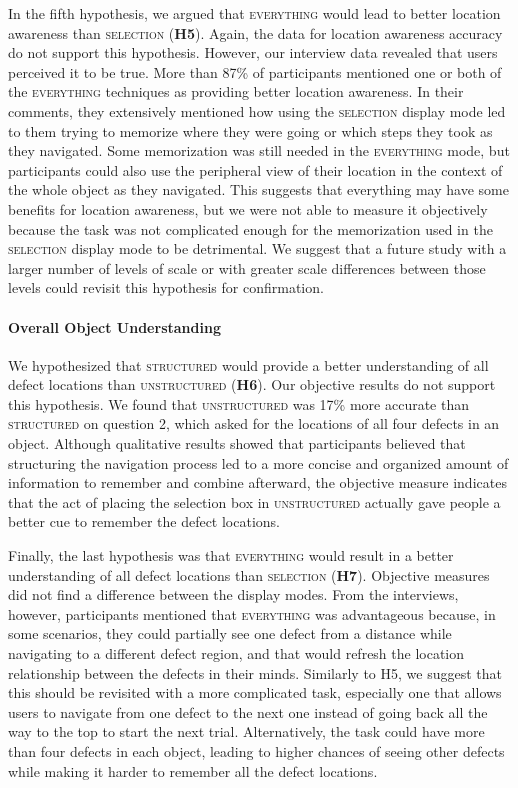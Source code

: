 In the fifth hypothesis, we argued that \textsc{everything} would lead to better location awareness than \textsc{selection} (\textbf{H5}). Again, the data for location awareness accuracy do not support this hypothesis. However, our interview data revealed that users perceived it to be true. More than 87\% of participants mentioned one or both of the \textsc{everything} techniques as providing better location awareness. In their comments, they extensively mentioned how using the \textsc{selection} display mode led to them trying to memorize where they were going or which steps they took as they navigated. Some memorization was still needed in the \textsc{everything} mode, but participants could also use the peripheral view of their location in the context of the whole object as they navigated. This suggests that everything may have some benefits for location awareness, but we were not able to measure it objectively because the task was not complicated enough for the memorization used in the \textsc{selection} display mode to be detrimental. We suggest that a future study with a larger number of levels of scale or with greater scale differences between those levels could revisit this hypothesis for confirmation.

\paragraph{\textbf{Overall Object Understanding}}
We hypothesized that \textsc{structured} would provide a better understanding of all defect locations than \textsc{unstructured} (\textbf{H6}). Our objective results do not support this hypothesis. We found that \textsc{unstructured} was 17\% more accurate than \textsc{structured} on question 2, which asked for the locations of all four defects in an object. Although qualitative results showed that participants believed that structuring the navigation process led to a more concise and organized amount of information to remember and combine afterward, the objective measure indicates that the act of placing the selection box in \textsc{unstructured} actually gave people a better cue to remember the defect locations.

Finally, the last hypothesis was that \textsc{everything} would result in a better understanding of all defect locations than \textsc{selection} (\textbf{H7}). Objective measures did not find a difference between the display modes. From the interviews, however, participants mentioned that \textsc{everything} was advantageous because, in some scenarios, they could partially see one defect from a distance while navigating to a different defect region, and that would refresh the location relationship between the defects in their minds. Similarly to H5, we suggest that this should be revisited with a more complicated task, especially one that allows users to navigate from one defect to the next one instead of going back all the way to the top to start the next trial. Alternatively, the task could have more than four defects in each object, leading to higher chances of seeing other defects while making it harder to remember all the defect locations.

